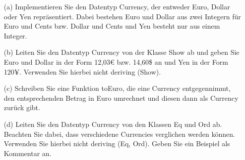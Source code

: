 \begin{itemize}
  \item [(a)] Implementieren Sie den Datentyp Currency, der entweder Euro, Dollar oder Yen repräsentiert. Dabei bestehen Euro und Dollar aus zwei Integern für Euro und Cents bzw. Dollar und Cents und Yen besteht nur aus einem Integer.

  \item [(b)] Leiten Sie den Datentyp Currency von der Klasse Show ab und geben Sie Euro und Dollar in der Form 12,03€ bzw. 14,60\$ an und Yen in der Form 120¥. Verwenden Sie hierbei nicht deriving (Show).

  \item [(c)] Schreiben Sie eine Funktion toEuro, die eine Currency entgegennimmt, den entsprechenden Betrag in Euro umrechnet und diesen dann als Currency zurück gibt.

  \item [(d)] Leiten Sie den Datentyp Currency von den Klassen Eq und Ord ab. Beachten Sie dabei, dass verschiedene Currencies verglichen werden können. Verwenden Sie hierbei nicht deriving (Eq, Ord). Geben Sie ein Beispiel als Kommentar an.
  
  \inputminted{Haskell}{A5_5.hs}

\end{itemize}

